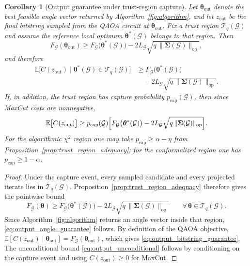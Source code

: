 \documentclass[aps,prx,reprint,superscriptaddress,longbibliography]{revtex4-2}
\newcommand{\QAOA}{\textnormal{\textsc{QAOA}}}
\newcommand{\calG}{\mathcal{G}}
\newcommand{\calT}{\mathcal{T}}
\newcommand{\bbE}{\mathbb{E}}
\newtheorem{corollary}[theorem]{Corollary}
\begin{document}
\begin{corollary}[Output guarantee under trust-region capture]
\label{cor:output_guarantee}
Let $\bm\theta_{\mathrm{out}}$ denote the best feasible angle vector returned by
Algorithm~\ref{fig:algorithm}, and let $z_{\mathrm{out}}$ be the final
bitstring sampled from the \QAOA{} circuit at
$\bm\theta_{\mathrm{out}}$. Fix a trust region $\calT_q(\calG)$ and
assume the reference local optimum $\bm\theta^*(\calG)$ belongs to that
region. Then
\begin{equation}
    F_\calG(\bm\theta_{\mathrm{out}})
    \ge F_\calG\bigl(\bm\theta^*(\calG)\bigr)
    - 2L_\calG\sqrt{q\,\|\bm\Sigma(\calG)\|_{\mathrm{op}}},
    \label{eq:output_angle_guarantee}
\end{equation}
and therefore
\begin{equation}
    \begin{aligned}
    \bbE\bigl[C(z_{\mathrm{out}})
    \mid \bm\theta^*(\calG) \in \calT_q(\calG)\bigr]
    &\ge F_\calG\bigl(\bm\theta^*(\calG)\bigr) \\
    &\quad - 2L_\calG\sqrt{q\,\|\bm\Sigma(\calG)\|_{\mathrm{op}}}.
    \end{aligned}
    \label{eq:output_bitstring_guarantee}
\end{equation}
If, in addition, the trust region has capture probability
$p_{\mathrm{cap}}(\calG)$, then since MaxCut costs are nonnegative,
\begin{equation}
    \bbE\bigl[C(z_{\mathrm{out}})\bigr]
    \ge p_{\mathrm{cap}}(\calG)
    \Bigl[F_\calG\bigl(\bm\theta^*(\calG)\bigr)
    - 2L_\calG\sqrt{q\,\|\bm\Sigma(\calG)\|_{\mathrm{op}}}\Bigr].
    \label{eq:output_unconditional}
\end{equation}
For the algorithmic $\chi^2$ region one may take
$p_{\mathrm{cap}} \ge \alpha-\eta$ from
Proposition~\ref{prop:trust_region_adequacy}; for the conformalized
region one has $p_{\mathrm{cap}} \ge 1-\alpha$.
\end{corollary}

\begin{proof}
Under the capture event, every sampled candidate and every projected
iterate lies in $\calT_q(\calG)$. Proposition~\ref{prop:trust_region_adequacy}
therefore gives the pointwise bound
\begin{equation*}
    F_\calG(\bm\theta)
    \ge F_\calG\bigl(\bm\theta^*(\calG)\bigr)
    - 2L_\calG\sqrt{q\,\|\bm\Sigma(\calG)\|_{\mathrm{op}}}
    \qquad \forall\,\bm\theta \in \calT_q(\calG).
\end{equation*}
Since Algorithm~\ref{fig:algorithm} returns an angle vector inside that
region, \cref{eq:output_angle_guarantee} follows. By definition of the
\QAOA{} objective,
$\bbE[C(z_{\mathrm{out}})\mid \bm\theta_{\mathrm{out}}]
= F_\calG(\bm\theta_{\mathrm{out}})$,
which gives \cref{eq:output_bitstring_guarantee}. The unconditional
bound \cref{eq:output_unconditional} follows by conditioning on the
capture event and using $C(z_{\mathrm{out}}) \ge 0$ for MaxCut.
\end{proof}
\end{document}
